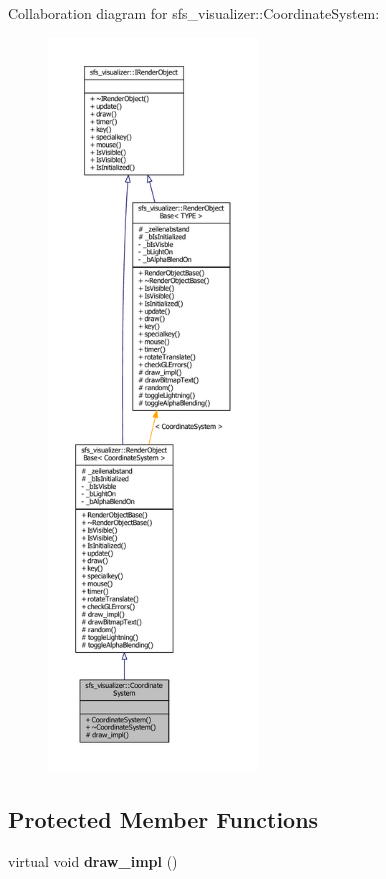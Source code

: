 Collaboration diagram for sfs\-\_\-visualizer\-:\-:Coordinate\-System\-:\nopagebreak
\begin{figure}[H]
\begin{center}
\leavevmode
\includegraphics[height=550pt]{d9/dd6/classsfs__visualizer_1_1CoordinateSystem__coll__graph}
\end{center}
\end{figure}
\subsection*{Protected Member Functions}
\begin{DoxyCompactItemize}
\item 
virtual void {\bfseries draw\-\_\-impl} ()\label{classsfs__visualizer_1_1CoordinateSystem_ad224ce35719deaee49250db24da0fd08}

\end{DoxyCompactItemize}
